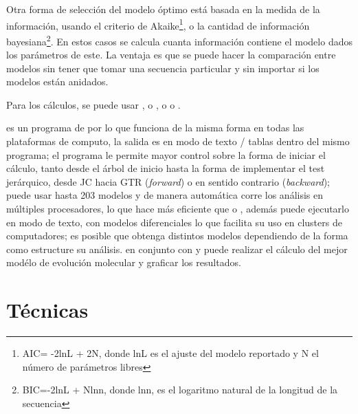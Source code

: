 Otra forma de selecci\'on del modelo \'optimo  est\'a basada en la medida de la informaci\'on, usando el criterio de Akaike\footnote{AIC= -2lnL + 2N, donde lnL es el ajuste del modelo reportado y N el n\'umero de par\'ametros libres}, 
o la cantidad de informaci\'on bayesiana\footnote{BIC=-2lnL + Nlnn, donde lnn, es el logaritmo natural de la longitud de la secuencia}.  
En estos casos se calcula cuanta informaci\'on contiene el modelo dados los par\'ametros de este. La ventaja es que se puede hacer la comparaci\'on entre modelos sin tener que tomar una secuencia particular y sin importar si los modelos est\'an anidados.

Para los c\'alculos, se puede usar , o , o  o . 
 
 es un programa de  por lo que funciona de la misma forma en todas las plataformas de computo, la  salida es en modo de texto / tablas dentro del mismo programa; el programa le permite mayor control sobre la forma de iniciar el c\'alculo, tanto desde el \'arbol de inicio hasta la forma de implementar el test jer\'arquico, desde JC hacia GTR (\textit{forward}) o en sentido contrario  (\textit{backward}); 
puede usar hasta 203 modelos y de manera  autom\'atica corre los an\'alisis en m\'ultiples procesadores, lo que hace m\'as eficiente que  o , adem\'as puede ejecutarlo en modo de texto, con modelos diferenciales lo que facilita su uso en clusters de computadores; es posible que obtenga distintos modelos dependiendo de la forma como estructure su an\'alisis.  en conjunto con  y  puede realizar el c\'alculo del mejor mod\'elo de evoluci\'on molecular y graficar los resultados.


\section*{T\'ecnicas}

%
\noindent

